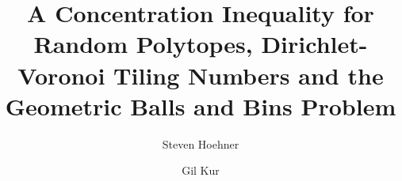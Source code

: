 \newtheorem{theorem}{Theorem}[section]
 \newtheorem{prop}[theorem]{Proposition}
\newtheorem{corollary}[theorem]{Corollary}
\newtheorem{lemma}[theorem]{Lemma}
\newtheorem{remark}[theorem]{Remark}
\newtheorem{conj}[theorem]{Conjecture}
\newtheorem{ques}[theorem]{Question}
\newcommand{\NN}{N^{-\frac 2{n-1}}}
\newcommand{\NNN}{N^{-\frac{1}{n-1}}}
\newcommand{\M}{M^{-\frac 2{n-1}}}
\newcommand{\Sn}{\mathbb{S}^{n-1}}
\newcommand\inneri[2]{\langle #1, #2 \rangle}
\newcommand{\Sp}{\mathbb{S}^{n-1}}
\newcommand{\qleq}{\accentset{*}{\leq}}
\newcommand{\1}{\mathbbm{1}}
\newcommand{\E}{{\mathbb{E}}}
\newcommand{\prob}{{\mathbb{P}}}
%
%
%
%
%


\title[Random Polytopes, Dirichlet-Voronoi Tiling Numbers and Geometric Balls and Bins  ]{A Concentration Inequality for Random Polytopes, Dirichlet-Voronoi Tiling Numbers and the Geometric Balls and Bins Problem}



\author{Steven Hoehner}     
\address{Longwood University, Department of Mathematics and Computer Science}
\author{Gil Kur} %
\address{Weizmann Institute of Science,
               Department of Computer Science and Mathematics}



